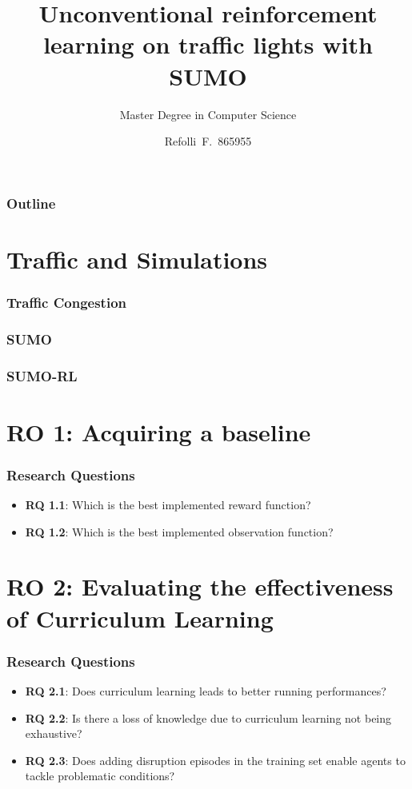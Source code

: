 \documentclass{beamer}
\title{Unconventional reinforcement learning on traffic lights with SUMO}
\subtitle{Master Degree in Computer Science}
\author{Refolli~F.~865955}
\begin{document}
\frame{\titlepage}

\begin{frame}
\frametitle{Outline}
\tableofcontents
\end{frame}

\section{Traffic and Simulations}
\begin{frame}
\frametitle{Traffic Congestion}
\end{frame}

\begin{frame}
\frametitle{SUMO}
\end{frame}

\begin{frame}
\frametitle{SUMO-RL}
\end{frame}

\section{\textbf{RO 1}: Acquiring a baseline}
\begin{frame}
\frametitle{Research Questions}
\begin{itemize}
\item \textbf{RQ 1.1}: Which is the best implemented reward function?
\item \textbf{RQ 1.2}: Which is the best implemented observation function?
\end{itemize}
\end{frame}

\section{\textbf{RO 2}: Evaluating the effectiveness of Curriculum Learning}
\begin{frame}
\frametitle{Research Questions}
\begin{itemize}
\item \textbf{RQ 2.1}: Does curriculum learning leads to better running performances?
\item \textbf{RQ 2.2}: Is there a loss of knowledge due to curriculum learning not being exhaustive?
\item \textbf{RQ 2.3}: Does adding disruption episodes in the training set enable agents to tackle problematic conditions?
\end{itemize}
\end{frame}
\end{document}
